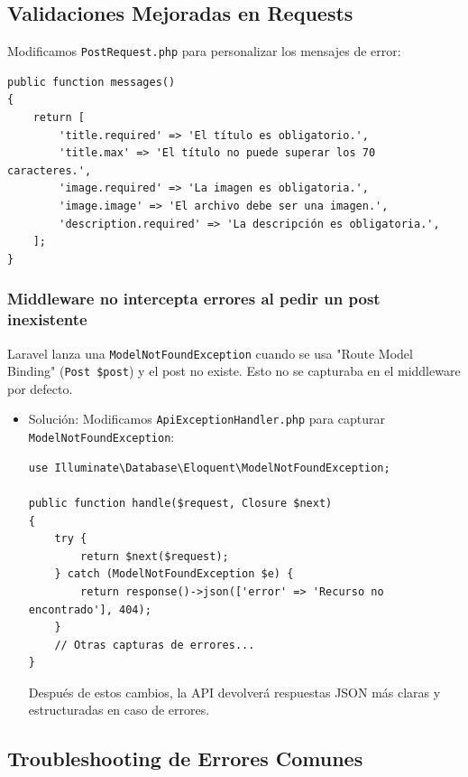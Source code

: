 \documentclass[11pt]{article}
\begin{document}
\subsection{Validaciones Mejoradas en Requests}
\label{sec:org588a269}

Modificamos \texttt{PostRequest.php} para personalizar los mensajes de error:

\begin{verbatim}
public function messages()
{
    return [
        'title.required' => 'El título es obligatorio.',
        'title.max' => 'El título no puede superar los 70 caracteres.',
        'image.required' => 'La imagen es obligatoria.',
        'image.image' => 'El archivo debe ser una imagen.',
        'description.required' => 'La descripción es obligatoria.',
    ];
}
\end{verbatim}


\subsubsection{Middleware no intercepta errores al pedir un post inexistente}
\label{sec:org2112ca3}
Laravel lanza una \texttt{ModelNotFoundException} cuando se usa "Route Model
Binding" (\texttt{Post \$post}) y el post no existe. Esto no se capturaba en
el middleware por defecto.

\begin{itemize}
\item Solución:
\label{sec:org8b234ed}
Modificamos \texttt{ApiExceptionHandler.php} para capturar \texttt{ModelNotFoundException}:

\begin{verbatim}
use Illuminate\Database\Eloquent\ModelNotFoundException;

public function handle($request, Closure $next)
{
    try {
        return $next($request);
    } catch (ModelNotFoundException $e) {
        return response()->json(['error' => 'Recurso no encontrado'], 404);
    }
    // Otras capturas de errores...
}
\end{verbatim}

Después de estos cambios, la API devolverá respuestas JSON más claras
y estructuradas en caso de errores.
\end{itemize}


\subsection{Troubleshooting de Errores Comunes}
\label{sec:org4b245c3}
\end{document}
